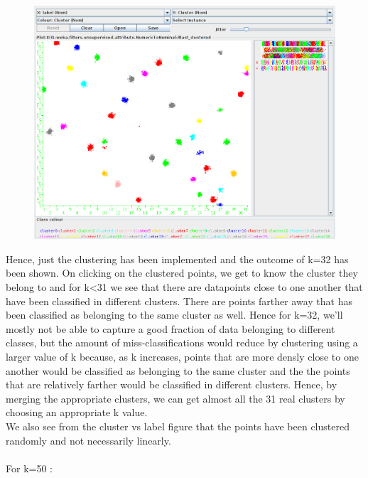 \documentclass[paper=a4, fontsize=11pt]{scrartcl}
\numberwithin{equation}{section}		%
\numberwithin{figure}{section}			%
\numberwithin{table}{section}				%
\begin{document}
\begin{figure}[H]
	\centering
  \includegraphics[width=1\textwidth]{6b}{\label{k=32: cluster vs label}}
\end{figure}

Hence, just the clustering has been implemented and the outcome of k=32 has been shown. On clicking on the clustered points, we get to know the cluster they belong to and for k<31 we see that there are datapoints close to one another that have been classified in different clusters. There are points farther away that has been classified as belonging to the same cluster as well. Hence for k=32, we'll mostly not be able to capture a good fraction of data belonging to different classes, but the amount of miss-classifications would reduce by clustering using a larger value of k because, as k increases, points that are more densly close to one another would be classified as belonging to the same cluster and the the points that are relatively farther would be classified in different clusters. Hence, by merging the appropriate clusters, we can get almost all the 31 real clusters by choosing an appropriate k value.\\



We also see from the cluster vs label figure that the points have been clustered randomly and not necessarily linearly.\\\\
For k=50 :
\end{document}
